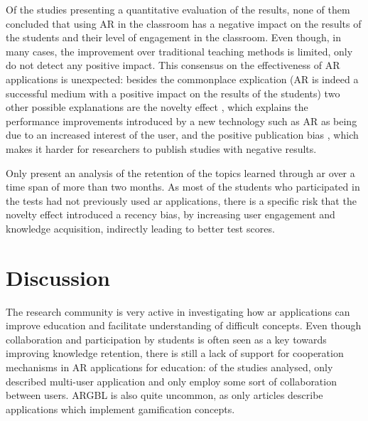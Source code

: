Of the \papersWithEvaluation studies presenting a quantitative evaluation of the results, none of them concluded that using AR in the classroom has a negative impact on the results of the students and their level of engagement in the classroom. Even though, in many cases, the improvement over traditional teaching methods is limited, only \cite{carlos2020voluminis} do not detect any positive impact. This consensus on the effectiveness of AR applications is unexpected: besides the commonplace explication (AR is indeed a successful medium with a  positive impact on the results of the students) two other possible explanations are the novelty effect \citep{pisapia1993learning}, which explains the performance improvements introduced by a new technology such as AR as being due to an increased interest of the user, and the positive publication bias \citep{begg1994publication}, which makes it harder for researchers to publish studies with negative results.

Only \cite{lin2016effect, gargrish2022evaluation} present an analysis of the retention of the topics learned through \gls{ar} over a time span of more than two months. As most of the students who participated in the tests had not previously used \gls{ar} applications, there is a specific risk that the novelty effect introduced a recency bias, by increasing user engagement and knowledge acquisition, indirectly leading to better test scores.

\section{Discussion} \label{sec:discussion}
The research community is very active in investigating how \gls{ar} applications can improve education and facilitate understanding of difficult concepts.
Even though collaboration and participation by students is often seen as a key towards improving knowledge retention, there is still a lack of support for cooperation mechanisms in AR applications for education: of the \papersSelected studies analysed, only \papersMultiuser described multi-user application and only \papersCollab employ some sort of collaboration between users. \gls{ARGBL} is also quite uncommon, as only \papersGames articles describe applications which implement gamification concepts. 

